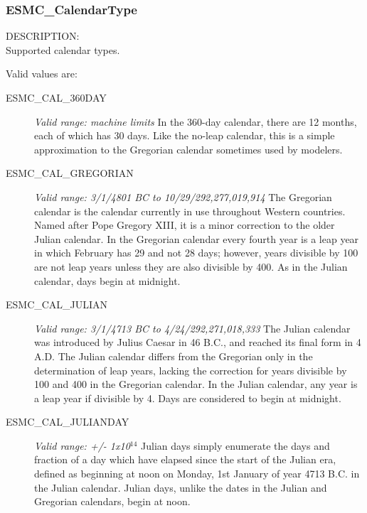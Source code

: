 
\label{subsec:Calendar_options}

\subsubsection{ESMC\_CalendarType}
\label{opt:calendartype}


{\sf DESCRIPTION:\\}
Supported calendar types.

Valid values are:
\begin{description}
      
\item [ESMC\_CAL\_360DAY] 
{\it Valid range: machine limits} 
\newline In the 360-day calendar, there are 12 months, each of which has 30 days.  
Like the no-leap calendar, this is a simple approximation to the Gregorian
calendar sometimes used by modelers.

\item [ESMC\_CAL\_GREGORIAN] 
{\it Valid range: 3/1/4801 BC to 10/29/292,277,019,914 }
\newline The Gregorian calendar is the calendar currently in use 
throughout Western countries.  Named after Pope Gregory XIII, it is a minor 
correction to the older Julian calendar. In the Gregorian calendar every
fourth year is a leap year in which February has 29 and not 28 days;
however, years divisible by 100 are not leap years unless they are also 
divisible  by 400.  As in the Julian calendar, days begin at midnight.

\item [ESMC\_CAL\_JULIAN]
{\it Valid range: 3/1/4713 BC to 4/24/292,271,018,333 } 
\newline The Julian calendar was introduced by Julius Caesar in 46 B.C., and 
reached its final form in 4 A.D.  The Julian calendar differs from the 
Gregorian only in the determination of leap years, lacking the correction 
for years divisible by 100 and 400 in the Gregorian calendar.  In the Julian 
calendar, any year is a leap year if divisible by 4.  Days are considered to 
begin at midnight.

\item [ESMC\_CAL\_JULIANDAY] 
{\it Valid range:  +/- 1x10$^{14}$} 
\newline Julian days simply enumerate the days and fraction of a day which 
have elapsed since the start of the Julian era, defined as beginning at noon 
on Monday, 1st January of year 4713 B.C. in the Julian calendar.  Julian days, 
unlike the dates in the Julian and Gregorian calendars, begin at noon.


\end{description}
